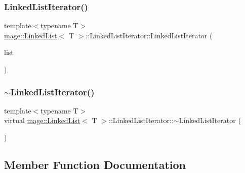 \subsubsection{\texorpdfstring{Linked\+List\+Iterator()}{LinkedListIterator()}}
{\footnotesize\ttfamily template$<$typename T$>$ \\
\hyperlink{classmage_1_1_linked_list}{mage\+::\+Linked\+List}$<$ T $>$\+::Linked\+List\+Iterator\+::\+Linked\+List\+Iterator (\begin{DoxyParamCaption}\item[{const \hyperlink{classmage_1_1_linked_list}{Linked\+List}$<$ T $>$ \&}]{list }\end{DoxyParamCaption})}

\hypertarget{structmage_1_1_linked_list_1_1_linked_list_iterator_a16631a6dc7aaaad10ba676f569da62b9}{}\label{structmage_1_1_linked_list_1_1_linked_list_iterator_a16631a6dc7aaaad10ba676f569da62b9} 
\subsubsection{\texorpdfstring{$\sim$\+Linked\+List\+Iterator()}{~LinkedListIterator()}}
{\footnotesize\ttfamily template$<$typename T$>$ \\
virtual \hyperlink{classmage_1_1_linked_list}{mage\+::\+Linked\+List}$<$ T $>$\+::Linked\+List\+Iterator\+::$\sim$\+Linked\+List\+Iterator (\begin{DoxyParamCaption}{ }\end{DoxyParamCaption})\hspace{0.3cm}{\ttfamily [virtual]}}



\subsection{Member Function Documentation}
\hypertarget{structmage_1_1_linked_list_1_1_linked_list_iterator_ae23127f7be560d81bbda5321690a7ef9}{}\label{structmage_1_1_linked_list_1_1_linked_list_iterator_ae23127f7be560d81bbda5321690a7ef9} 
